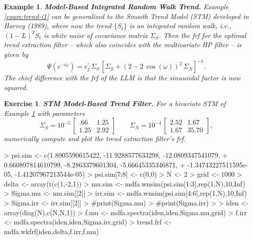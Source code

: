 \documentclass[a4paper]{book}
\newtheorem{Example}{Example}
\newtheorem{Exercise}{Exercise}
\begin{document}
\begin{Example} {\bf Model-Based Integrated Random Walk Trend.} \rm
\label{exam:trend-i2}
  Example \ref{exam:trend-i1} can be generalized to the Smooth 
  Trend Model (STM) developed in Harvey (1989),
 where now the trend $\{ S_t \}$ is an integrated random walk, 
 i.e., ${(1-L)}^2 S_t$ is white noise of
 covariance matrix $\Sigma_{S}$.   Then the frf for the optimal 
 trend extraction filter -- which also coincides
 with the multivariate HP filter  -- is given by
\[ 
 \Psi (e^{-i \omega}) = e_j^{\prime} \, \Sigma_{S} \, 
 { \left[ \Sigma_{S} + {(2 - 2 \, \cos (\omega))}^2 \, \Sigma_{N} \right] }^{-1}.
\]
 The chief difference with the frf of the LLM is that the sinusoidal factor is now squared.  
\end{Example}

\begin{Exercise} {\bf STM Model-Based Trend Filter.} \rm
\label{exer:trend-i2}
 For a bivariate STM of Example \ref{exer:trend-i2} with parameters 
\[
 \Sigma_{S} = 10^{-5} \, \left[ \begin{array}{ll} 
   .66   &  1.25   \\
   1.25  &  2.92   \end{array}  \right]
 \qquad  \Sigma_{N} =  10^{-4} \, \left[ \begin{array}{ll}
        2.52  &  1.67    \\
        1.67 &  35.70   \end{array} \right],
\]
 numerically compute and plot the trend extraction filter's frf.
\end{Exercise}


\begin{Schunk}
\begin{Sinput}
> psi.sim <- c(1.8905590615422, -11.9288577633298, -12.0809347541079, 
+              0.660897814610799, -8.2863379601304, -5.66645335346871, 
+              -1.34743227511595e-05, -1.41207967213544e-05)
> psi.sim[7:8] <- c(0,0)
> N <- 2
> grid <- 1000
> delta <- array(t(c(1,-2,1)) %
> mu.sim <- mdfa.wnsim(psi.sim[1:3],rep(1,N),10,Inf)
> Sigma.mu <- mu.sim[[2]]
> irr.sim <- mdfa.wnsim(psi.sim[4:6],rep(1,N),10,Inf)
> Sigma.irr <- irr.sim[[2]]
> #print(Sigma.mu)
> #print(Sigma.irr)
> 
> iden <- array(diag(N),c(N,N,1))
> f.mu <- mdfa.spectra(iden,iden,Sigma.mu,grid)
> f.irr <- mdfa.spectra(iden,iden,Sigma.irr,grid)
> trend.frf <- mdfa.wkfrf(iden,delta,f.irr,f.mu)
\end{Sinput}
\end{Schunk}
\end{document}
